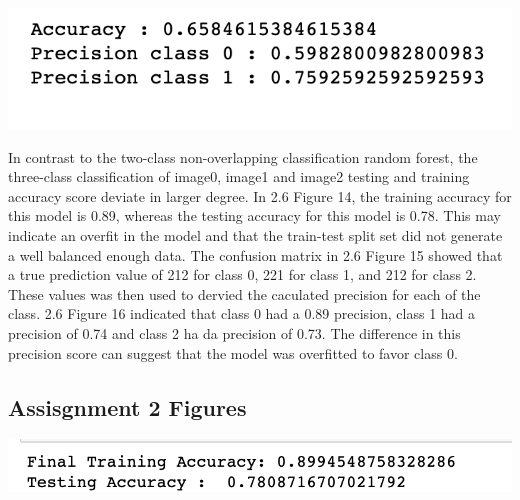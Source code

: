\documentclass[12pt]{article}
\begin{document}
\begin{multicols*}{2}
\begin{center}
    \includegraphics[scale=0.5]{../screenshot/Overlapping-Elastic-results/hand_score.png}

  \end{center}

  \hspace*{5mm} In contrast to the two-class non-overlapping classification random forest, the three-class
  classification of image0, image1 and image2 testing and training accuracy score deviate in larger degree.
  In 2.6 Figure 14, the training accuracy for this model is 0.89, whereas the testing accuracy for this model is 
  0.78. This may indicate an overfit in the model and that the train-test split set did not generate a well balanced enough data.
  The confusion matrix in 2.6 Figure 15 showed that a true prediction value of 212 for class 0, 221 for class 1, and 212 for class 2.
  These values was then used to dervied the caculated precision for each of the class. 2.6 Figure 16 indicated that class 0 had a 0.89 precision,
  class 1 had a precision of 0.74 and class 2 ha da precision of 0.73. The difference in this precision score can suggest that the model
  was overfitted to favor class 0. 


  \subsection{Assisgnment 2 Figures} 
	\begin{center}
		\includegraphics[scale=0.5]{../screenshot/Rf-Non-Overlapping012/score.png}


\end{center}
\end{multicols*}
\end{document}
